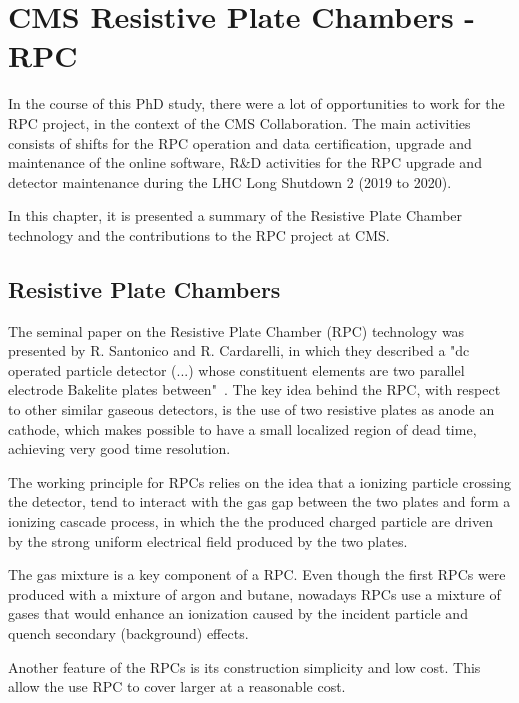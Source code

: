 \chapter{CMS Resistive Plate Chambers - RPC}


In the course of this PhD study, there were a lot of opportunities to work for the RPC project, in the context of the CMS Collaboration. The main activities consists of shifts for the RPC operation and data certification, upgrade and maintenance of the online software, R\&D activities for the RPC upgrade and detector maintenance during the LHC Long Shutdown 2 (2019 to 2020).

In this chapter, it is presented a summary of the Resistive Plate Chamber technology and the contributions to the RPC project at CMS.

\section{Resistive Plate Chambers}



The seminal paper on the Resistive Plate Chamber (RPC) technology was presented by R. Santonico and R. Cardarelli, in which they described a "dc operated particle detector (...) whose constituent elements are two parallel electrode Bakelite plates between"~\cite{rpc_seminal}. The key idea behind the RPC, with respect to other similar gaseous detectors, is the use of two resistive plates as anode an cathode, which makes possible to have a small localized region of dead time, achieving very good time resolution. 

The working principle for RPCs relies on the idea that a ionizing particle crossing the detector, tend to interact with the gas gap between the two plates and form a ionizing cascade process, in which the the produced charged particle are driven by the strong uniform electrical field produced by the two plates.

The gas mixture is a key component of a RPC. Even though the first RPCs were produced with a mixture of argon and butane, nowadays RPCs use a mixture of gases that would enhance an ionization caused by the incident particle and quench secondary (background) effects.

Another feature of the RPCs is its construction simplicity and low cost. This allow the use RPC to cover larger at a reasonable cost. 

